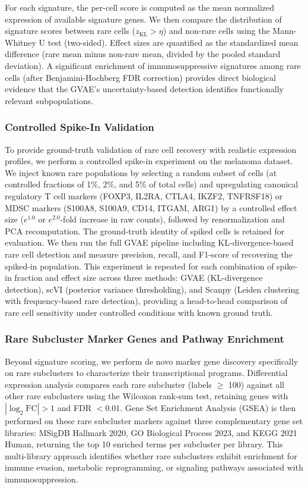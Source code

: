 \documentclass{article}
\begin{document}
For each signature, the per-cell score is computed as the mean normalized expression of available signature genes. We then compare the distribution of signature scores between rare cells ($z_{\text{KL}} > \eta$) and non-rare cells using the Mann-Whitney U test (two-sided). Effect sizes are quantified as the standardized mean difference (rare mean minus non-rare mean, divided by the pooled standard deviation). A significant enrichment of immunosuppressive signatures among rare cells (after Benjamini-Hochberg FDR correction) provides direct biological evidence that the GVAE's uncertainty-based detection identifies functionally relevant subpopulations.

\subsubsection{Controlled Spike-In Validation}

To provide ground-truth validation of rare cell recovery with realistic expression profiles, we perform a controlled spike-in experiment on the melanoma dataset. We inject known rare populations by selecting a random subset of cells (at controlled fractions of 1\%, 2\%, and 5\% of total cells) and upregulating canonical regulatory T cell markers (FOXP3, IL2RA, CTLA4, IKZF2, TNFRSF18) or MDSC markers (S100A8, S100A9, CD14, ITGAM, ARG1) by a controlled effect size ($e^{1.0}$ or $e^{2.0}$-fold increase in raw counts), followed by renormalization and PCA recomputation. The ground-truth identity of spiked cells is retained for evaluation. We then run the full GVAE pipeline including KL-divergence-based rare cell detection and measure precision, recall, and F1-score of recovering the spiked-in population. This experiment is repeated for each combination of spike-in fraction and effect size across three methods: GVAE (KL-divergence detection), scVI (posterior variance thresholding), and Scanpy (Leiden clustering with frequency-based rare detection), providing a head-to-head comparison of rare cell sensitivity under controlled conditions with known ground truth.

\subsubsection{Rare Subcluster Marker Genes and Pathway Enrichment}

Beyond signature scoring, we perform de novo marker gene discovery specifically on rare subclusters to characterize their transcriptional programs. Differential expression analysis compares each rare subcluster (labels $\geq$ 100) against all other rare subclusters using the Wilcoxon rank-sum test, retaining genes with $|\log_2 \text{FC}| > 1$ and FDR $< 0.01$. Gene Set Enrichment Analysis (GSEA) is then performed on these rare subcluster markers against three complementary gene set libraries: MSigDB Hallmark 2020, GO Biological Process 2023, and KEGG 2021 Human, returning the top 10 enriched terms per subcluster per library. This multi-library approach identifies whether rare subclusters exhibit enrichment for immune evasion, metabolic reprogramming, or signaling pathways associated with immunosuppression.
\end{document}
